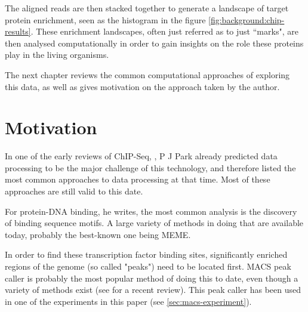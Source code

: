 \documentclass[parskip]{cs4rep}
\begin{document}
The aligned reads are then stacked together to generate a landscape of target protein enrichment, seen as the histogram in the figure \ref{fig:background:chip-results}. These enrichment landscapes, often just referred as to just ``marks", are then analysed computationally in order to gain insights on the role these proteins play in the living organisms.
 
The next chapter reviews the common computational approaches of exploring this data, as well as gives motivation on the approach taken by the author.

\chapter{Motivation}

In one of the early reviews of ChIP-Seq, \cite{Park:2009wc}, P J Park already predicted data processing to be the major challenge of this technology, and therefore listed the most common approaches to data processing at that time. Most of these approaches are still valid to this date.

For protein-DNA binding, he writes, the most common analysis is the discovery of binding sequence motifs. A large variety of methods in doing that are available today, probably the best-known one being MEME\cite{Grundy:1997vb}.

In order to find these transcription factor binding sites, significantly enriched regions of the genome (so called "peaks") need to be located first. MACS peak caller\cite{Zhang:2008wp} is probably the most popular method of doing this to date, even though a variety of methods exist (see \cite{Furey:2012ha} for a recent review). This peak caller has been used in one of the experiments in this paper (see \autoref{sec:macs-experiment}).
\end{document}
